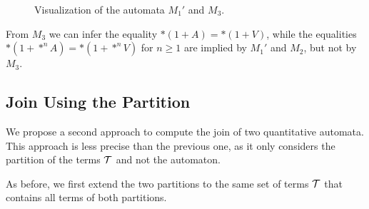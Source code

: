\begin{example}
\begin{figure}
\begin{minipage}{0.45\textwidth}
        \end{minipage}

    \caption{Visualization of the automata $M_1'$ and $M_3$.}\label{m1-m3-qfa}
\end{figure}
    From $M_3$ we can infer the equality $*(1 + A) = *(1 + V)$, while the equalities $*(1 + *^n A) = *(1 + *^n V)$ for $n \geq 1$ are implied by $M_1'$ and $M_2$, but not by $M_3$.
\end{example}

\subsection{Join Using the Partition}\label{subsection:join-partition}

We propose a second approach to compute the join of two quantitative automata.
This approach is less precise than the previous one, as it only considers the partition of the terms $\mathcal{T}$ and not the automaton.

As before, we first extend the two partitions to the same set of terms $\mathcal{T}$ that contains all terms of both partitions.

